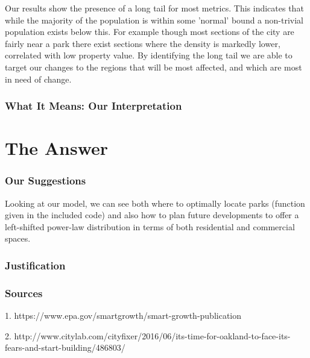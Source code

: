 \documentclass[]{report}
\begin{document}
	Our results show the presence of a long tail for most metrics. This indicates that while the majority of the population is within some 'normal' bound a non-trivial population exists below this. For example though most sections of the city are fairly near a park there exist sections where the density is markedly lower, correlated with low property value. By identifying the long tail we are able to target our changes to the regions that will be most affected, and which are most in need of change. 
	
	\section{What It Means: Our Interpretation}
	
	
\part{The Answer}
	\section{Our Suggestions}
	Looking at our model, we can see both where to optimally locate parks (function given in the included code) and also how to plan future developments to offer a left-shifted power-law distribution in terms of both residential and commercial spaces.
	
	\section{Justification}
	
	\section{Sources}
	
	1. https://www.epa.gov/smartgrowth/smart-growth-publication 
	
	2. http://www.citylab.com/cityfixer/2016/06/its-time-for-oakland-to-face-its-fears-and-start-building/486803/ 
	
\end{document}
